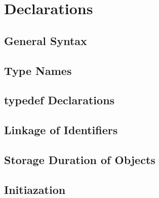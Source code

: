 \section{Declarations}

\subsection{General Syntax}
\subsection{Type Names}
\subsection{typedef Declarations}
\subsection{Linkage of Identifiers}
\subsection{Storage Duration of Objects}
\subsection{Initiazation}